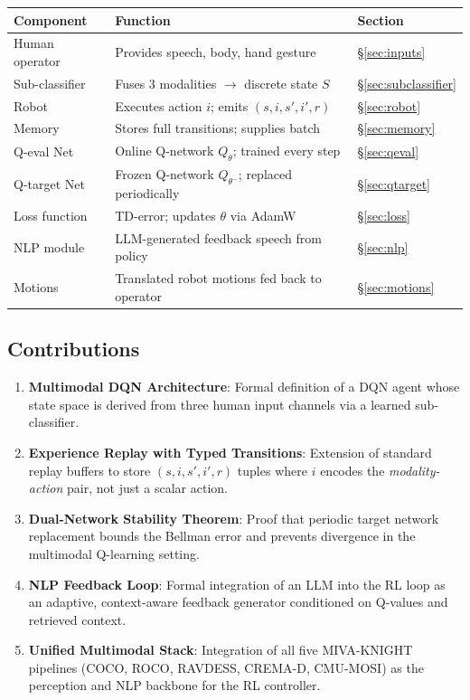 \documentclass[12pt,a4paper]{article}
\theoremstyle{definition}
\theoremstyle{plain}
\theoremstyle{remark}
\newcommand{\Qeval}{Q_\theta}
\newcommand{\Qtgt}{Q_{\theta^-}}
\begin{document}
\begin{center}
\renewcommand{\arraystretch}{1.2}
\begin{tabular}{lll}
\toprule
\textbf{Component} & \textbf{Function} & \textbf{Section} \\
\midrule
Human operator & Provides speech, body, hand gesture & \S\ref{sec:inputs} \\
Sub-classifier & Fuses 3 modalities $\to$ discrete state $S$ & \S\ref{sec:subclassifier} \\
Robot & Executes action $i$; emits $(s,i,s',i',r)$ & \S\ref{sec:robot} \\
Memory & Stores full transitions; supplies batch & \S\ref{sec:memory} \\
Q-eval Net & Online Q-network $\Qeval$; trained every step & \S\ref{sec:qeval} \\
Q-target Net & Frozen Q-network $\Qtgt$; replaced periodically & \S\ref{sec:qtarget} \\
Loss function & TD-error; updates $\theta$ via AdamW & \S\ref{sec:loss} \\
NLP module & LLM-generated feedback speech from policy & \S\ref{sec:nlp} \\
Motions & Translated robot motions fed back to operator & \S\ref{sec:motions} \\
\bottomrule
\end{tabular}
\end{center}

\subsection{Contributions}

\begin{tcolorbox}[keybox,title={Summary of Contributions}]
\begin{enumerate}[label=\textbf{C\arabic*.}]
  \item \textbf{Multimodal DQN Architecture}: Formal definition of a DQN agent whose state space is derived from three human input channels via a learned sub-classifier.
  \item \textbf{Experience Replay with Typed Transitions}: Extension of standard replay buffers to store $(s, i, s', i', r)$ tuples where $i$ encodes the \emph{modality-action} pair, not just a scalar action.
  \item \textbf{Dual-Network Stability Theorem}: Proof that periodic target network replacement bounds the Bellman error and prevents divergence in the multimodal Q-learning setting.
  \item \textbf{NLP Feedback Loop}: Formal integration of an LLM into the RL loop as an adaptive, context-aware feedback generator conditioned on Q-values and retrieved context.
  \item \textbf{Unified Multimodal Stack}: Integration of all five MIVA-KNIGHT pipelines (COCO, ROCO, RAVDESS, CREMA-D, CMU-MOSI) as the perception and NLP backbone for the RL controller.
\end{enumerate}
\end{tcolorbox}
\end{document}

